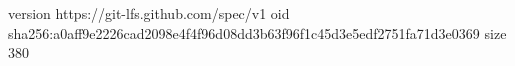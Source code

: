 version https://git-lfs.github.com/spec/v1
oid sha256:a0aff9e2226cad2098e4f4f96d08dd3b63f96f1c45d3e5edf2751fa71d3e0369
size 380

